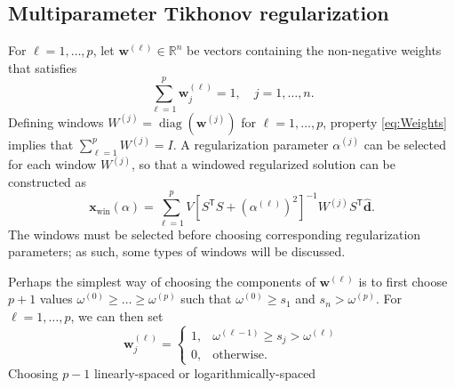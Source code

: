 \documentclass[12pt]{article}
\newcommand{\dVec}{\mathbf{d}}	%
\newcommand{\xVec}{\mathbf{x}}	%
\newcommand{\wVec}{\mathbf{w}}	%
\newcommand{\trans}[1]{{#1}^\mathsf{T}}	%
\newcommand{\inv}[1]{{#1}^{-1}}	%
\DeclareMathOperator{\diag}{diag}	%
\newcommand{\dft}[1]{\widehat{#1}}	%
\newcommand{\regparam}{\alpha}
\newcommand{\xWin}{\xVec_{\text{win}}(\regparam)}	%
\newcommand{\singular}{s}	%
\begin{document}
\subsection{Multiparameter Tikhonov regularization} \label{sec:Multiparameter}
For $\ell = 1,\ldots,p$, let $\wVec^{(\ell)} \in \mathbb{R}^n$ be vectors containing the non-negative weights that satisfies
\begin{equation}
\label{eq:Weights}
\sum_{\ell=1}^{p} \wVec_j^{(\ell)} = 1, \quad j = 1,\ldots,n.
\end{equation}
Defining windows $W^{(j)} = \diag(\wVec^{(j)})$ for $\ell = 1,\ldots,p$, property \eqref{eq:Weights} implies that $\sum_{\ell=1}^p W^{(j)} = I$.  A regularization parameter $\regparam^{(j)}$ can be selected for each window $W^{(j)}$, so that a windowed regularized solution can be constructed as
\begin{equation}
\label{eq:TikSolWindow}
\xWin = \sum_{\ell=1}^p V\inv{\left[\trans{S}S + (\regparam^{(\ell)})^2\right]}W^{(j)}\trans{S}\dft{\dVec}.
\end{equation}
The windows must be selected before choosing corresponding regularization parameters; as such, some types of windows will be discussed. \par
Perhaps the simplest way of choosing the components of $\wVec^{(\ell)}$ is to first choose $p+1$ values $\omega^{(0)} \geq \ldots \geq \omega^{(p)}$ such that $\omega^{(0)} \geq \singular_1$ and $\singular_n > \omega^{(p)}$. For $\ell = 1,\ldots,p$, we can then set
\begin{equation}
\label{eq:Non-overlapping windows}
\wVec_j^{(\ell)} = \begin{cases}
1, & \omega^{(\ell-1)} \geq \singular_j > \omega^{(\ell)} \\
0, & \text{otherwise.}
\end{cases}
\end{equation}
Choosing $p-1$ linearly-spaced or logarithmically-spaced
\end{document}
